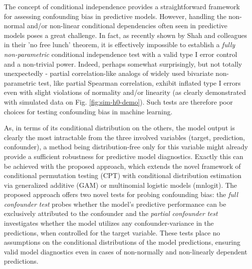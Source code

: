 \documentclass{article}
\begin{document}
The concept of conditional independence provides a straightforward framework for assessing confounding bias in predictive models. However, handling the non-normal and/or non-linear conditional dependencies often seen in predictive models\citep{garcia2009study, kristensen2017whole} poses a great challenge.
In fact, as recently shown by Shah and colleagues in their 'no free lunch' theorem\cite{shah2020hardness}, it is effectively impossible to establish a \emph{fully non-parametric} conditional independence test with a valid type I error control and a non-trivial power. Indeed, perhaps somewhat surprisingly, but not totally unexpectedly\cite{korn1984ranges} - partial correlation-like analogs of widely used bivariate non-parametric test, like partial Spearman correlation, exhibit inflated type I errors even with slight violations of normality and/or linearity (as clearly demonstrated with simulated data on Fig. \ref{fig:sim-h0-demo}). Such tests are therefore poor choices for testing confounding bias in machine learning.

As, in terms of its conditional distribution on the others, the model output is clearly the most intractable from the three involved variables (target, prediction, confounder)\citep{garcia2009study, kristensen2017whole}, a method being distribution-free only for this variable might already provide a sufficient robustness for predictive model diagnostics. Exactly this can be achieved with the proposed approach, which extends the novel framework of conditional permutation testing (CPT)\cite{berrett2020conditional} with conditional distribution estimation via generalized additive (GAM)\citep{hastie1987generalized} or multinomial logistic models (mnlogit)\cite{bennett1966multiple, jones1975proability}. The proposed approach offers two novel tests for probing confounding bias: the \emph{full confounder test} probes whether the model's predictive performance can be exclusively attributed to the confounder and the \emph{partial confounder test} investigates whether the model utilizes any confounder-variance in the predictions, when controlled for the target variable.
These tests place no assumptions on the conditional distributions of the model predictions, ensuring valid model diagnostics even in cases of non-normally and non-linearly dependent predictions.
\end{document}
